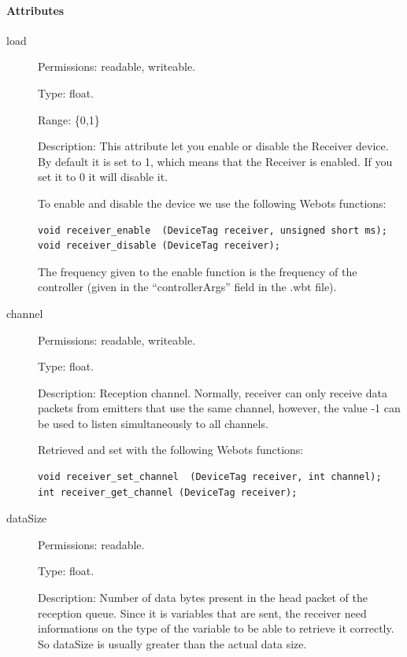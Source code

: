 \paragraph{Attributes}
\label{webots.uobjects.robotdevices.receiver.attributes}%

\noindent
\begin{description}
\item[{load}]     Permissions: readable, writeable.


  Type: float.


  Range: \{0,1\}


  Description: This attribute let you enable or disable the Receiver
  device.  By default it is set to 1, which means that the Receiver is
  enabled. If you set it to 0 it will disable it.


          To enable and disable the device we use the following Webots functions:


\begin{lstlisting}
void receiver_enable  (DeviceTag receiver, unsigned short ms);
void receiver_disable (DeviceTag receiver);
\end{lstlisting}

          The frequency given to the enable function is the frequency of the
          \urbi controller (given in the ``controllerArgs'' field in the .wbt file).

\item[{         channel
 }]            Permissions: readable, writeable.


 Type: float.


 Description: Reception channel. Normally, receiver can only receive
 data packets from emitters that use the same channel, however, the
 value -{}1 can be used to listen simultaneously to all channels.


          Retrieved and set with the following Webots functions:


\begin{lstlisting}
void receiver_set_channel  (DeviceTag receiver, int channel);
int receiver_get_channel (DeviceTag receiver);
\end{lstlisting}
\item[{         dataSize
 }]            Permissions: readable.


 Type: float.


 Description: Number of data bytes present in the head packet of the
 reception queue. Since it is \urbi variables that are sent, the
 receiver need informations on the type of the variable to be able to
 retrieve it correctly. So dataSize is usually greater than the actual
 data size.



\end{description}
